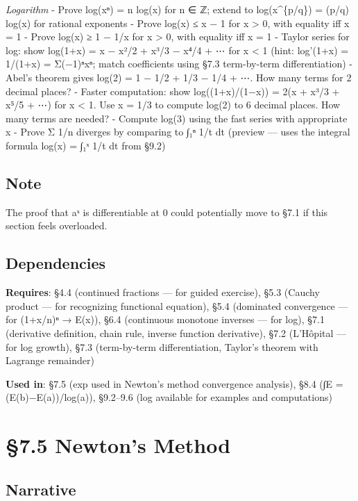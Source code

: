 \documentclass[
  10pt,
  letterpaper,
]{scrbook}
\begin{document}
\emph{Logarithm} - Prove log(xⁿ) = n log(x) for n ∈ ℤ; extend to
log(x\^{}\{p/q\}) = (p/q) log(x) for rational exponents - Prove log(x) ≤
x − 1 for x \textgreater{} 0, with equality iff x = 1 - Prove log(x) ≥ 1
− 1/x for x \textgreater{} 0, with equality iff x = 1 - Taylor series
for log: show log(1+x) = x − x²/2 + x³/3 − x⁴/4 + ⋯ for
\textbar x\textbar{} \textless{} 1 (hint: log'(1+x) = 1/(1+x) =
Σ(−1)ⁿxⁿ; match coefficients using §7.3 term-by-term differentiation) -
Abel's theorem gives log(2) = 1 − 1/2 + 1/3 − 1/4 + ⋯. How many terms
for 2 decimal places? - Faster computation: show log((1+x)/(1−x)) = 2(x
+ x³/3 + x⁵/5 + ⋯) for \textbar x\textbar{} \textless{} 1. Use x = 1/3
to compute log(2) to 6 decimal places. How many terms are needed? -
Compute log(3) using the fast series with appropriate x - Prove Σ 1/n
diverges by comparing to ∫₁ⁿ 1/t dt (preview --- uses the integral
formula log(x) = ∫₁ˣ 1/t dt from §9.2)

\subsection{Note}\label{note}

The proof that aˣ is differentiable at 0 could potentially move to §7.1
if this section feels overloaded.

\subsection{Dependencies}\label{dependencies-32}

\textbf{Requires}: §4.4 (continued fractions --- for guided exercise),
§5.3 (Cauchy product --- for recognizing functional equation), §5.4
(dominated convergence --- for (1+x/n)ⁿ → E(x)), §6.4 (continuous
monotone inverses --- for log), §7.1 (derivative definition, chain rule,
inverse function derivative), §7.2 (L'Hôpital --- for log growth), §7.3
(term-by-term differentiation, Taylor's theorem with Lagrange remainder)

\textbf{Used in}: §7.5 (exp used in Newton's method convergence
analysis), §8.4 (∫E = (E(b)−E(a))/log(a)), §9.2--9.6 (log available for
examples and computations)

\section{§7.5 Newton's Method}\label{newtons-method}

\subsection{Narrative}\label{narrative-33}
\end{document}

